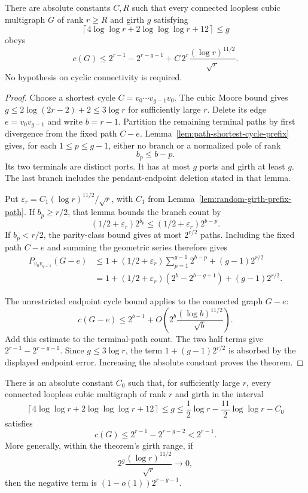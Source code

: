\begin{theorem}
\label{thm:random-girth-window}
There are absolute constants $C,R$ such that every connected loopless cubic multigraph $G$ of rank $r\ge R$ and girth $g$ satisfying
\[
 \left\lceil4\log\log r+2\log\log\log r+12\right\rceil
 \le g
\]
obeys
\[
 c(G)\le
 2^{r-1}-2^{r-g-1}
 +C\,2^r\frac{(\log r)^{11/2}}{\sqrt r}.
\]
No hypothesis on cyclic connectivity is required.
\end{theorem}

\begin{proof}
Choose a shortest cycle $C=v_0\cdots v_{g-1}v_0$.
The cubic Moore bound gives $g\le2\log(2r-2)+2\le3\log r$ for sufficiently large $r$.
Delete its edge $e=v_0v_{g-1}$ and write $b=r-1$.
Partition the remaining terminal paths by first divergence from the fixed path $C-e$.
Lemma~\ref{lem:path-shortest-cycle-prefix} gives, for each $1\le p\le g-1$, either no branch or a normalized pole of rank
\[
 b_p\le b-p.
\]
Its two terminals are distinct ports.
It has at most $g$ ports and girth at least $g$.
The last branch includes the pendant-endpoint deletion stated in that lemma.

Put $\varepsilon_r=C_1(\log r)^{11/2}/\sqrt r$, with $C_1$ from Lemma~\ref{lem:random-girth-prefix-path}.
If $b_p\ge r/2$, that lemma bounds the branch count by
\[
 (1/2+\varepsilon_r)2^{b_p}
 \le(1/2+\varepsilon_r)2^{b-p}.
\]
If $b_p<r/2$, the parity-class bound gives at most $2^{r/2}$ paths.
Including the fixed path $C-e$ and summing the geometric series therefore gives
\begin{align*}
 P_{v_0v_{g-1}}(G-e)
 &\le1+(1/2+\varepsilon_r)\sum_{p=1}^{g-1}2^{b-p}
       +(g-1)2^{r/2}\\
 &=1+(1/2+\varepsilon_r)(2^b-2^{b-g+1})
       +(g-1)2^{r/2}.
\end{align*}

The unrestricted endpoint cycle bound applies to the connected graph $G-e$:
\[
 c(G-e)\le2^{b-1}
 +O\!\left(2^b\frac{(\log b)^{11/2}}{\sqrt b}\right).
\]
Add this estimate to the terminal-path count.
The two half terms give $2^{r-1}-2^{r-g-1}$.
Since $g\le3\log r$, the term $1+(g-1)2^{r/2}$ is absorbed by the displayed endpoint error.
Increasing the absolute constant proves the theorem.
\end{proof}

\begin{corollary}
\label{cor:random-girth-window-strict}
There is an absolute constant $C_0$ such that, for sufficiently large $r$, every connected loopless cubic multigraph of rank $r$ and girth in the interval
\[
 \left\lceil4\log\log r+2\log\log\log r+12\right\rceil
 \le g
 \le\frac12\log r-\frac{11}{2}\log\log r-C_0
\]
satisfies
\[
 c(G)\le2^{r-1}-2^{r-g-2}<2^{r-1}.
\]
More generally, within the theorem's girth range, if
\[
 2^g\frac{(\log r)^{11/2}}{\sqrt r}\longrightarrow0,
\]
then the negative term is $(1-o(1))2^{r-g-1}$.
\end{corollary}

